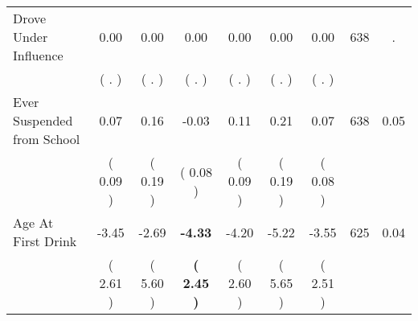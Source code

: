\begin{tabular}{lcccccccc}
Drove Under Influence &      0.00 &      0.00 &      0.00 &      0.00 &      0.00 &      0.00 & 638 &          . \\ 
 & (        . ) & (        . ) & (        . ) & (        . ) & (        . ) & (        . ) & \\
Ever Suspended from School &      0.07 &      0.16 &     -0.03 &      0.11 &      0.21 &      0.07 & 638 &       0.05 \\ 
 & (     0.09 ) & (     0.19 ) & (     0.08 ) & (     0.09 ) & (     0.19 ) & (     0.08 ) & \\
Age At First Drink &     -3.45 &     -2.69 & \textbf{    -4.33} &     -4.20 &     -5.22 &     -3.55 & 625 &       0.04 \\ 
 & (     2.61 ) & (     5.60 ) & \textbf{(     2.45 )} & (     2.60 ) & (     5.65 ) & (     2.51 ) & \\
\bottomrule
\end{tabular}
